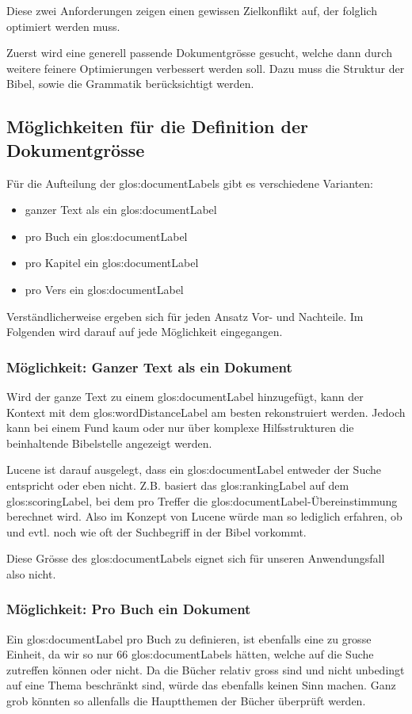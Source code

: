 Diese zwei Anforderungen zeigen einen gewissen Zielkonflikt auf, der folglich optimiert werden muss.

Zuerst wird eine generell passende Dokumentgrösse gesucht, welche dann durch weitere feinere Optimierungen verbessert werden soll.
Dazu muss die Struktur der Bibel, sowie die Grammatik berücksichtigt werden.

\subsection{Möglichkeiten für die Definition der Dokumentgrösse}
Für die Aufteilung der \glspl{glos:documentLabel} gibt es verschiedene Varianten:
\begin{itemize}[noitemsep]
	\item ganzer Text als ein \gls{glos:documentLabel}
	\item pro Buch ein \gls{glos:documentLabel}
	\item pro Kapitel ein \gls{glos:documentLabel}
	\item pro Vers ein \gls{glos:documentLabel}
\end{itemize}

Verständlicherweise ergeben sich für jeden Ansatz Vor- und Nachteile.
Im Folgenden wird darauf auf jede Möglichkeit eingegangen.

\subsubsection{Möglichkeit: Ganzer Text als ein Dokument}
Wird der ganze Text zu einem \gls{glos:documentLabel} hinzugefügt, kann der Kontext mit dem \gls{glos:wordDistanceLabel} am besten rekonstruiert werden.
Jedoch kann bei einem Fund kaum oder nur über komplexe Hilfsstrukturen die beinhaltende Bibelstelle angezeigt werden.

Lucene ist darauf ausgelegt, dass ein \gls{glos:documentLabel} entweder der Suche entspricht oder eben nicht.
Z.B. basiert das \gls{glos:rankingLabel} auf dem \gls{glos:scoringLabel}, bei dem pro Treffer die \gls{glos:documentLabel}-Übereinstimmung berechnet wird.
Also im Konzept von Lucene würde man so lediglich erfahren, ob und evtl. noch wie oft der Suchbegriff in der Bibel vorkommt.

Diese Grösse des \gls{glos:documentLabel}s eignet sich für unseren Anwendungsfall also nicht.

\subsubsection{Möglichkeit: Pro Buch ein Dokument}
Ein \gls{glos:documentLabel} pro Buch zu definieren, ist ebenfalls eine zu grosse Einheit, da wir so nur 66 \glspl{glos:documentLabel} hätten, welche auf die Suche zutreffen können oder nicht.
Da die Bücher relativ gross sind und nicht unbedingt auf eine Thema beschränkt sind, würde das ebenfalls keinen Sinn machen.
Ganz grob könnten so allenfalls die Hauptthemen der Bücher überprüft werden.

